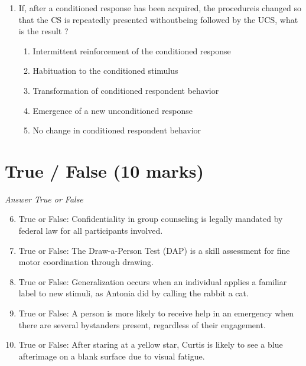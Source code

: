 \documentclass[12pt]{article}
\begin{document}
\begin{enumerate}[label=\arabic*.]
\begin{enumerate}[label=(\alph*)]
    \item symmetry
    \item complexity
    \item novelty
    \item similarity
    \item proximity
\end{enumerate}
\item If, after a conditioned response has been acquired, the procedureis changed so that the CS is repeatedly presented withoutbeing followed by the UCS, what is the result ?
\begin{enumerate}[label=(\alph*)]
    \item Intermittent reinforcement of the conditioned response
    \item Habituation to the conditioned stimulus
    \item Transformation of conditioned respondent behavior
    \item Emergence of a new unconditioned response
    \item No change in conditioned respondent behavior
\end{enumerate}
\end{enumerate}

\section*{True / False (10 marks)}
\textit{Answer True or False}
\begin{enumerate}[label=\arabic*.]
\setcounter{enumi}{5}
\item True or False: Confidentiality in group counseling is legally mandated by federal law for all participants involved.
\item True or False: The Draw-a-Person Test (DAP) is a skill assessment for fine motor coordination through drawing.
\item True or False: Generalization occurs when an individual applies a familiar label to new stimuli, as Antonia did by calling the rabbit a cat.
\item True or False: A person is more likely to receive help in an emergency when there are several bystanders present, regardless of their engagement.
\item True or False: After staring at a yellow star, Curtis is likely to see a blue afterimage on a blank surface due to visual fatigue.
\end{enumerate}
\end{document}

